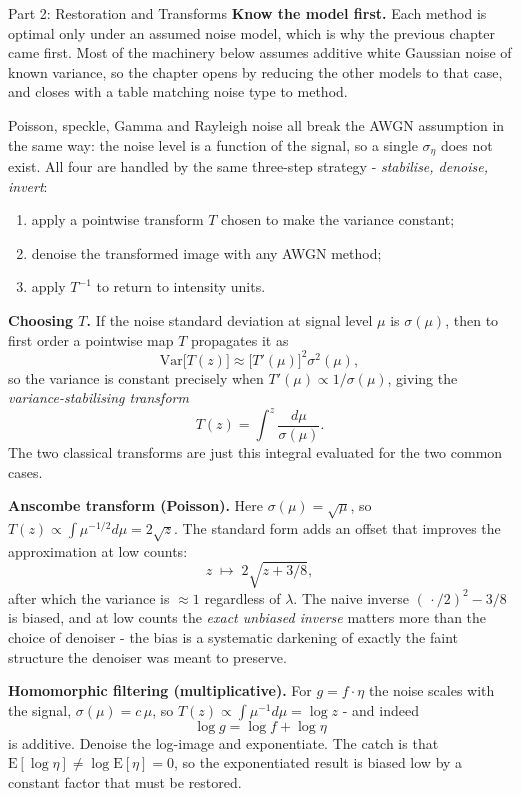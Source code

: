 \documentclass[letterpaper]{article}
\begin{document}
\begin{notes}{Part 2: Restoration and Transforms}
\textbf{Know the model first.} Each method is optimal only under an assumed noise model, which is why the previous chapter came first. Most of the machinery below assumes additive white Gaussian noise of known variance, so the chapter opens by reducing the other models to that case, and closes with a table matching noise type to method.


Poisson, speckle, Gamma and Rayleigh noise all break the AWGN assumption in the same way: the noise level is a function of the signal, so a single $\sigma_\eta$ does not exist. All four are handled by the same three-step strategy - \emph{stabilise, denoise, invert}:
\begin{enumerate}
    \item apply a pointwise transform $T$ chosen to make the variance constant;
    \item denoise the transformed image with any AWGN method;
    \item apply $T^{-1}$ to return to intensity units.
\end{enumerate}

\textbf{Choosing $T$.} If the noise standard deviation at signal level $\mu$ is $\sigma(\mu)$, then to first order a pointwise map $T$ propagates it as
$$\mathrm{Var}\bigl[T(z)\bigr] \approx \bigl[T'(\mu)\bigr]^2\sigma^2(\mu),$$
so the variance is constant precisely when $T'(\mu)\propto 1/\sigma(\mu)$, giving the \emph{variance-stabilising transform}
$$T(z) = \int^z \frac{d\mu}{\sigma(\mu)}.$$
The two classical transforms are just this integral evaluated for the two common cases.

\textbf{Anscombe transform (Poisson).} Here $\sigma(\mu)=\sqrt\mu$, so $T(z)\propto\int \mu^{-1/2}d\mu = 2\sqrt{z}$. The standard form adds an offset that improves the approximation at low counts:
$$z\;\longmapsto\;2\sqrt{z+3/8},$$
after which the variance is $\approx 1$ regardless of $\lambda$. The naive inverse $(\,\cdot/2)^2-3/8$ is biased, and at low counts the \emph{exact unbiased inverse} matters more than the choice of denoiser - the bias is a systematic darkening of exactly the faint structure the denoiser was meant to preserve.

\textbf{Homomorphic filtering (multiplicative).} For $g=f\cdot\eta$ the noise scales with the signal, $\sigma(\mu)=c\,\mu$, so $T(z)\propto\int\mu^{-1}d\mu=\log z$ - and indeed
$$\log g = \log f + \log\eta$$
is additive. Denoise the log-image and exponentiate. The catch is that $\mathrm{E}[\log\eta]\ne\log\mathrm{E}[\eta]=0$, so the exponentiated result is biased low by a constant factor that must be restored.


\end{notes}
\end{document}
